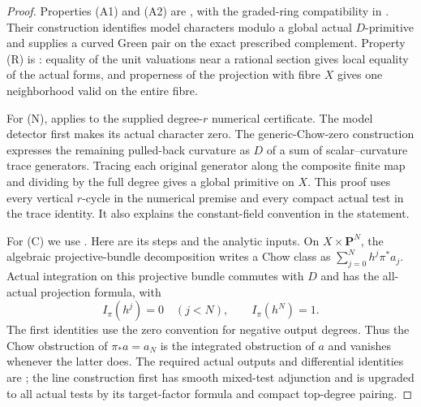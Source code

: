 \documentclass[11pt]{article}
\theoremstyle{definition}
\theoremstyle{remark}
\numberwithin{equation}{section}
\begin{document}
\begin{proof}
Properties (A1) and (A2) are \cite[Theorem 1.1]{ChowGreenPairs}, with the graded-ring compatibility in \cite[\texttt{r12p:ring}]{CompactParameter}. Their construction identifies model characters modulo a global actual $D$-primitive and supplies a curved Green pair on the exact prescribed complement. Property (R) is : equality of the unit valuations near a rational section gives local equality of the actual forms, and properness of the projection with fibre $X$ gives one neighborhood valid on the entire fibre.

For (N),  applies to the supplied degree-$r$ numerical certificate. The model detector first makes its actual character zero. The generic-Chow-zero construction expresses the remaining pulled-back curvature as $D$ of a sum of scalar--curvature trace generators. Tracing each original generator along the composite finite map and dividing by the full degree gives a global primitive on $X$. This proof uses every vertical $r$-cycle in the numerical premise and every compact actual test in the trace identity. It also explains the constant-field convention in the statement.

For (C) we use \cite[\texttt{r16cov:projective-push}, \texttt{r16cov:proper-push}, \texttt{r16cov:correspondences}]{NativeCovariance}. Here are its steps and the analytic inputs. On $X\times\mathbf P^N$, the algebraic projective-bundle decomposition writes a Chow class as $\sum_{j=0}^N h^j\pi^*a_j$. Actual integration on this projective bundle commutes with $D$ and has the all-actual projection formula, with
\[
 I_\pi(h^j)=0\quad(j<N),\qquad I_\pi(h^N)=1.
\]
The first identities use the zero convention for negative output degrees. Thus the Chow obstruction of $\pi_*a=a_N$ is the integrated obstruction of $a$ and vanishes whenever the latter does. The required actual outputs and differential identities are \cite[\texttt{r16out:line}, \texttt{r16out:bundle}]{ActualProjectiveOutput}; the line construction first has smooth mixed-test adjunction and is upgraded to all actual tests by its target-factor formula and compact top-degree pairing.


\end{proof}
\end{document}
